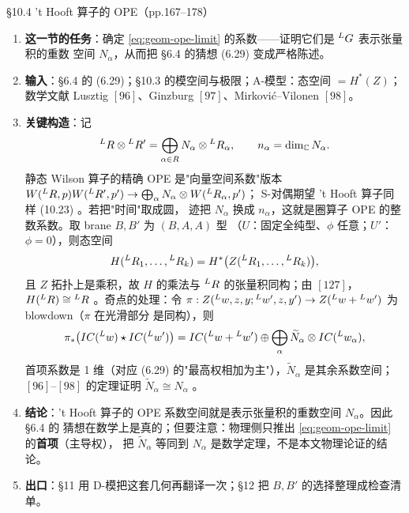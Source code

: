 \begin{kcard}{\S10.4 't Hooft 算子的 OPE（pp.167--178）}
\begin{enumerate}[label=\textbf{\arabic*}]
\item \textbf{这一节的任务}：确定 \eqref{eq:geom-ope-limit} 的系数——证明它们是 ${}^{L}G$ 表示张量积的重数
  空间 $N_\alpha$，从而把 \S6.4 的猜想 (6.29) 变成严格陈述。
\item \textbf{输入}：\S6.4 的 (6.29)；\S10.3 的模空间与极限；A-模型：态空间 $=H^*(Z)$；数学文献
  Lusztig $[96]$、Ginzburg $[97]$、Mirkovi\'c--Vilonen $[98]$。
\item \textbf{关键构造}：记
\begin{equation}
{}^{L}R\otimes{}^{L}R'=\bigoplus_{\alpha\in R}N_\alpha\otimes{}^{L}R_\alpha ,
\qquad n_\alpha=\dim_{\mathbb{C}} N_\alpha .
\label{eq:geom-tensor-decomp}
\end{equation}
  静态 Wilson 算子的精确 OPE 是"向量空间系数"版本
  $W({}^{L}R,p)W({}^{L}R',p')\to\bigoplus_\alpha N_\alpha\otimes W({}^{L}R_\alpha,p')$；
  S-对偶期望 't Hooft 算子同样 (10.23) \pA{}。若把"时间"取成圆，
  迹把 $N_\alpha$ 换成 $n_\alpha$，这就是圈算子 OPE 的整数系数。取 brane $B,B'$ 为 $(B,A,A)$ 型
  （$U$：固定全纯型、$\phi$ 任意；$U'$：$\phi=0$），则态空间
  \begin{equation}
H({}^{L}R_1,\dots,{}^{L}R_k)=H^*\big(Z({}^{L}R_1,\dots,{}^{L}R_k)\big),
\label{eq:geom-states}
\end{equation}
  且 $Z$ 拓扑上是乘积，故 $H$ 的乘法与 ${}^{L}R$ 的张量积同构；由 $[127]$，$H({}^{L}R)\cong{}^{L}R$
  \pA{}。奇点的处理：令
  $\pi:Z({}^{L}w,z,y;{}^{L}w',z,y')\to Z({}^{L}w+{}^{L}w')$ 为 blowdown（$\pi$ 在光滑部分
  是同构），则
\begin{equation}
\pi_*\big(IC({}^{L}w)\star IC({}^{L}w')\big)
=IC({}^{L}w+{}^{L}w')\oplus\bigoplus_\alpha\widetilde N_\alpha\otimes IC({}^{L}w_\alpha),
\label{eq:geom-ic}
\end{equation}
  首项系数是 1 维（对应 (6.29) 的"最高权相加为主"），$\widetilde N_\alpha$ 是其余系数空间；
  $[96]$--$[98]$ 的定理证明 $\widetilde N_\alpha\cong N_\alpha$ \pA{}。
\item \textbf{结论}：'t Hooft 算子的 OPE 系数空间就是表示张量积的重数空间 $N_\alpha$。因此 \S6.4 的
  猜想在数学上是真的；但要注意：物理侧只推出 \eqref{eq:geom-ope-limit} 的\textbf{首项}（主导权），
  把 $\widetilde N_\alpha$ 等同到 $N_\alpha$ 是数学定理，不是本文物理论证的结论。
\item \textbf{出口}：\S11 用 D-模把这套几何再翻译一次；\S12 把 $B,B'$ 的选择整理成检查清单。

\end{enumerate}
\end{kcard}
